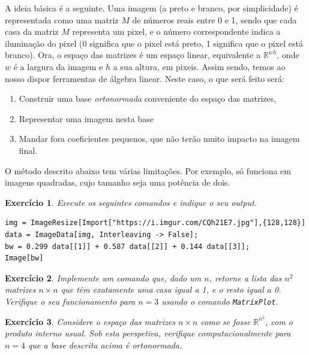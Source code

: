 \documentclass{article}
\newtheorem{ex}{Exercício}[section]
\newcommand{\R}{\mathbb{R}}
\begin{document}
A ideia básica é a seguinte. Uma imagem (a preto e branco, por simplicidade) é representada como uma matriz $M$ de números reais entre 0 e 1, sendo que cada casa da matriz $M$ representa um pixel, e o número correspondente indica a iluminação do pixel (0 significa que o pixel está preto, 1 significa que o pixel está branco). Ora, o espaço das matrizes é um espaço linear, equivalente a $\R^{wh}$, onde $w$ é a largura da imagem e $h$ a sua altura, em pixeis. Assim sendo, temos ao nosso dispor ferramentas de álgebra linear. Neste caso, o que será feito será:
\begin{enumerate}
\item Construir uma base \emph{ortonormada} conveniente do espaço das matrizes,
\item Representar uma imagem nesta base
\item Mandar fora coeficientes pequenos, que não terão muito impacto na imagem final.
\end{enumerate}

O método descrito abaixo tem várias limitações. Por exemplo, só funciona em imagens quadradas, cujo tamanho seja uma potência de dois.

\begin{ex}
Execute os seguintes comandos e indique o seu output.
\begin{verbatim}
img = ImageResize[Import["https://i.imgur.com/CQh21E7.jpg"],{128,128}]
data = ImageData[img, Interleaving -> False];
bw = 0.299 data[[1]] + 0.587 data[[2]] + 0.144 data[[3]];
Image[bw]
\end{verbatim}
\end{ex}

\begin{ex}\label{excanonical}
Implemente um comando que, dado um $n$, retorne a lista das $n^2$ matrizes $n \times n$ que têm exatamente uma casa igual a 1, e o resto igual a 0. Verifique o seu funcionamento para $n = 3$ usando o comando \texttt{MatrixPlot}.
\end{ex}

\begin{ex}
Considere o espaço das matrizes $n \times n$ como se fosse $\R^{n^2}$, com o produto interno usual. Sob esta perspetiva, verifique computacionalmente para $n=4$ que a base descrita acima é ortonormada.
\end{ex}
\end{document}
